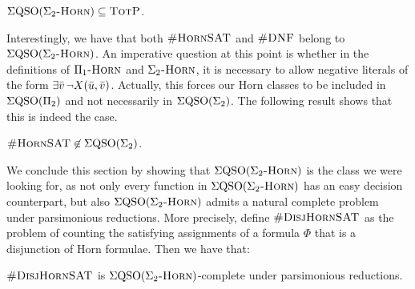 \begin{proposition}\label{prop:ehorn-pe}
$\Sigma{\rm QSO}(\Sigma_2\textsc{-Horn}) \subseteq \text{\sc TotP}$.
\end{proposition}
Interestingly, we have that both $\textsc{\#HornSAT}$ and $\textsc{\#DNF}$ belong to $\Sigma{\rm QSO}(\Sigma_2\textsc{-Horn})$. 
An imperative question at this point is whether in the definitions of $\Pi_1\textsc{-Horn}$ and $\Sigma_2\textsc{-Horn}$, it is necessary to allow negative literals of the form $\exists \bar{v} \, \neg X(\bar{u},\bar{v})$. Actually, this forces our Horn classes to be included in $\Sigma{\rm QSO}(\Pi_{2})$ and not necessarily in $\Sigma{\rm QSO}(\Sigma_{2})$. The following result shows that this is indeed the case.

\begin{proposition}\label{prop:hsat-not-sigma2}	
$\textsc{\#HornSAT} \not\in \Sigma{\rm QSO}(\Sigma_{2})$.
\end{proposition}
We conclude this section by showing that $\Sigma{\rm QSO}(\Sigma_2\textsc{-Horn})$ is the class we were looking for, as not only every function in $\Sigma{\rm QSO}(\Sigma_2\textsc{-Horn})$ has an easy decision counterpart, but also $\Sigma{\rm QSO}(\Sigma_2\textsc{-Horn})$ admits a natural complete problem under parsimonious reductions. More precisely, define 
$\textsc{\#DisjHornSAT}$ as the problem of counting the satisfying assignments of a formula $\Phi$ that is a disjunction of Horn formulae. Then we have that:

\begin{theorem} \label{sigma2hard}
	$\textsc{\#DisjHornSAT}$ is $\Sigma{\rm QSO}(\Sigma_2\textsc{-Horn})$-complete under parsimonious reductions. 
\end{theorem}